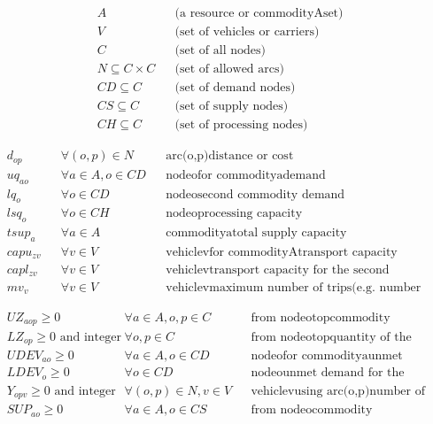 \documentclass[10pt]{article}
\begin{document}
\begin{align*}
& A && \text{(a resource or commodityAset)} \\
& V && \text{(set of vehicles or carriers)} \\
& C && \text{(set of all nodes)} \\
& N \subseteq C \times C && \text{(set of allowed arcs)} \\
& CD \subseteq C && \text{(set of demand nodes)} \\
& CS \subseteq C && \text{(set of supply nodes)} \\
& CH \subseteq C && \text{(set of processing nodes)}
\end{align*}

\begin{align*}
& d_{op} && \forall (o,p) \in N && \text{arc(o,p)distance or cost} \\
& uq_{ao} && \forall a \in A, o \in CD && \text{nodeofor commodityademand} \\
& lq_{o} && \forall o \in CD && \text{nodeosecond commodity demand} \\
& lsq_{o} && \forall o \in CH && \text{nodeoprocessing capacity} \\
& tsup_{a} && \forall a \in A && \text{commodityatotal supply capacity} \\
& capu_{zv} && \forall v \in V && \text{vehiclevfor commodityAtransport capacity} \\
& capl_{zv} && \forall v \in V && \text{vehiclevtransport capacity for the second commodity} \\
& mv_{v} && \forall v \in V && \text{vehiclevmaximum number of trips(e.g. number of node visits)}
\end{align*}

\begin{align*}
& UZ_{aop} \ge 0 && \forall a \in A, o, p \in C && \text{from nodeotopcommodity transportedaquantity} \\
& LZ_{op} \ge 0 \text{ and integer} && \forall o, p \in C && \text{from nodeotopquantity of the second commodity transported} \\
& UDEV_{ao} \ge 0 && \forall a \in A, o \in CD && \text{nodeofor commodityaunmet demand} \\
& LDEV_{o} \ge 0 && \forall o \in CD && \text{nodeounmet demand for the second commodity} \\
& Y_{opv} \ge 0 \text{ and integer} && \forall (o, p) \in N, v \in V && \text{vehiclevusing arc(o,p)number of times} \\
& SUP_{ao} \ge 0 && \forall a \in A, o \in CS && \text{from nodeocommodity suppliedaquantity}
\end{align*}
\end{document}
